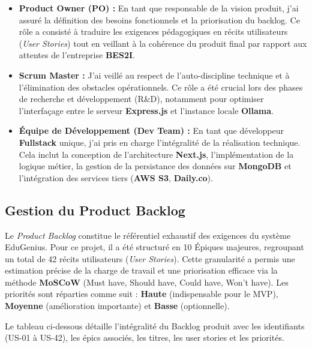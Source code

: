 \begin{itemize}
    \item \textbf{Product Owner (PO) :} En tant que responsable de la vision produit, j'ai assuré la définition des besoins fonctionnels et la priorisation du backlog. Ce rôle a consisté à traduire les exigences pédagogiques en récits utilisateurs (\textit{User Stories}) tout en veillant à la cohérence du produit final par rapport aux attentes de l'entreprise \textbf{BES2I}.
    \item \textbf{Scrum Master :} J'ai veillé au respect de l'auto-discipline technique et à l'élimination des obstacles opérationnels. Ce rôle a été crucial lors des phases de recherche et développement (R\&D), notamment pour optimiser l'interfaçage entre le serveur \textbf{Express.js} et l'instance locale \textbf{Ollama}.
    \item \textbf{Équipe de Développement (Dev Team) :} En tant que développeur \textbf{Fullstack} unique, j'ai pris en charge l'intégralité de la réalisation technique. Cela inclut la conception de l'architecture \textbf{Next.js}, l'implémentation de la logique métier, la gestion de la persistance des données sur \textbf{MongoDB} et l'intégration des services tiers (\textbf{AWS S3}, \textbf{Daily.co}).
\end{itemize}

\subsection{Gestion du Product Backlog}
Le \textit{Product Backlog} constitue le référentiel exhaustif des exigences du système EduGenius. Pour ce projet, il a été structuré en 10 Épiques majeures, regroupant un total de 42 récits utilisateurs (\textit{User Stories}). Cette granularité a permis une estimation précise de la charge de travail et une priorisation efficace via la méthode \textbf{MoSCoW} (Must have, Should have, Could have, Won't have). Les priorités sont réparties comme suit : \textbf{Haute} (indispensable pour le MVP), \textbf{Moyenne} (amélioration importante) et \textbf{Basse} (optionnelle).

Le tableau ci-dessous détaille l'intégralité du Backlog produit avec les identifiants (US-01 à US-42), les épics associés, les titres, les user stories et les priorités.

\bigskip

